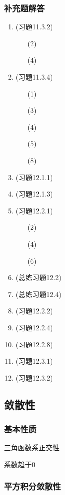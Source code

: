 \documentclass[a4paper,UTF8,fontset=windows,AutoFakeBold]{ctexart}
\theoremstyle{ex}
\begin{document}
\subsubsection{补充题解答}
\begin{enumerate}
    \item (习题11.3.2)
    \begin{enumerate}
        \item[(2)] 
        \item[(4)] 
    \end{enumerate}
    \item (习题11.3.4)
    \begin{enumerate}
        \item[(1)]
        \item[(3)]  
        \item[(4)] 
        \item[(5)] 
        \item[(8)] 
    \end{enumerate}
    \item (习题12.1.1)
    \item (习题12.1.3)
    \item (习题12.2.1)
    \begin{enumerate}
        \item[(2)]
        \item[(4)]
        \item[(6)]   
    \end{enumerate}
    \item (总练习题12.2)
    \item (总练习题12.4)
    \item (习题12.2.2)
    \item (习题12.2.4)
    \item (习题12.2.8)
    \item (习题12.3.1)
    \item (习题12.3.2)
\end{enumerate}

\subsection{敛散性}
\subsubsection{基本性质}
三角函数系正交性

系数趋于0

\subsubsection{平方积分敛散性}
\end{document}
